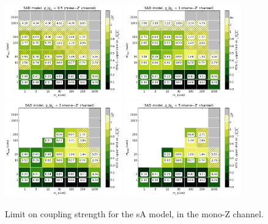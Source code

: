 \begin{figure}[!h]
\begin{center}
\includegraphics[width=0.45\textwidth]{figures/grid_allpoints_SAD_rat05.png}
\includegraphics[width=0.45\textwidth]{figures/grid_allpoints_SAD_rat1.png}
\includegraphics[width=0.45\textwidth]{figures/grid_allpoints_SAD_rat2.png}
\includegraphics[width=0.45\textwidth]{figures/grid_allpoints_SAD_rat5.png}
\caption{Limit on coupling strength for the sA model, in the mono-Z channel.}
\label{fig:MonoZ_SAD_couplinglimit}
\end{center}
\end{figure}

